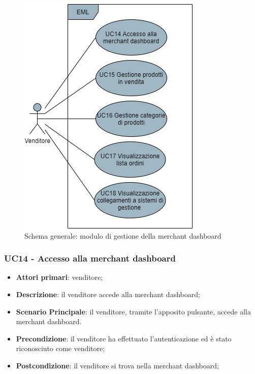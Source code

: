 \begin{figure}[H]
\centering
\includegraphics[scale=0.6]{res/UseCase/Immagini/MerchantDashboard}
\caption{Schema generale: modulo di gestione della merchant dashboard}
\end{figure}

\subsubsection{UC14 - Accesso alla merchant dashboard}
\begin{itemize}
\item \textbf{Attori primari}: venditore;
\item \textbf{Descrizione}: il venditore accede alla merchant dashboard;
\item \textbf{Scenario Principale}: il venditore, tramite l'apposito pulsante, accede alla merchant dashboard.
\item \textbf{Precondizione}: il venditore ha effettuato l'autenticazione ed è stato riconosciuto come venditore;
\item \textbf{Postcondizione}: il venditore si trova nella merchant dashboard;
\end{itemize}

